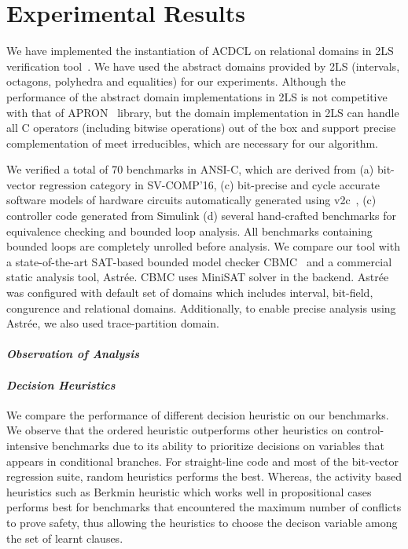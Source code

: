 \section{Experimental Results}
We have implemented the instantiation of ACDCL on relational domains
in 2LS verification tool~\cite{2ls}.  We have used the abstract domains
provided by 2LS (intervals, octagons, polyhedra and equalities) for our
experiments. Although the performance of the abstract domain implementations 
in 2LS is not competitive with that of APRON~\cite{apron} library, but 
the domain implementation in 2LS can handle all C operators 
(including bitwise operations) out of the box and support precise
complementation of meet irreducibles, which are necessary for our algorithm. 

We verified a total of 70 benchmarks in ANSI-C, which are derived from 
(a) bit-vector regression category in SV-COMP'16, (c) bit-precise and 
cycle accurate software models of hardware circuits automatically 
generated using v2c~\cite{mtk2016}, (c) controller code generated 
from Simulink (d) several hand-crafted benchmarks for equivalence 
checking and bounded loop analysis.  All benchmarks containing 
bounded loops are completely unrolled before analysis.  We compare 
our tool with a state-of-the-art SAT-based bounded model checker 
CBMC~\cite{cbmc} and a commercial static analysis tool, Astr{\'e}e.  
CBMC uses MiniSAT solver in the backend.  Astr{\'e}e was configured with 
default set of domains which includes interval, bit-field, congurence and 
relational domains.  Additionally, to enable precise analysis using 
Astr{\'e}e, we also used trace-partition domain.   

\paragraph {\em \textbf{Observation of Analysis}}

\paragraph {\em \textbf{Decision Heuristics}} We compare the performance of 
different decision heuristic on our benchmarks.  We observe that 
the ordered heuristic outperforms other heuristics on control-intensive 
benchmarks due to its ability to prioritize decisions on variables that 
appears in conditional branches.  For straight-line code and most of 
the bit-vector regression suite, random heuristics performs the best.  
Whereas, the activity based heuristics such as Berkmin heuristic which 
works well in propositional cases performs best for benchmarks that 
encountered the maximum number of conflicts to prove safety, thus allowing 
the heuristics to choose the decison variable among the set of learnt clauses.   

